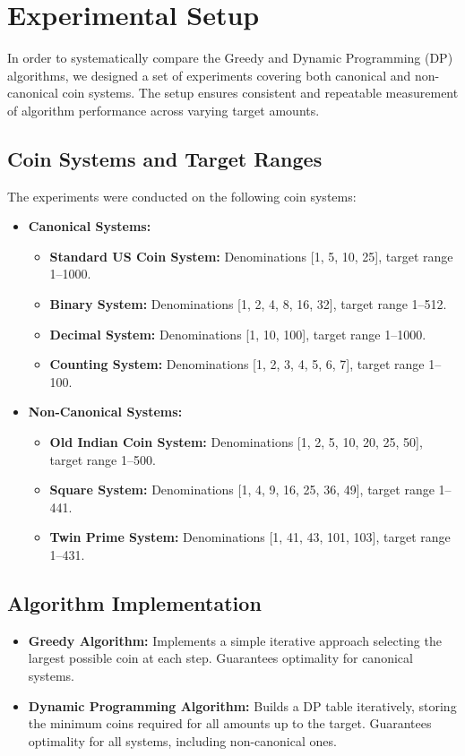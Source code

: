 \documentclass[12pt,a4paper]{report}
\begin{document}
\section{Experimental Setup}
\label{sec:comparison_experimental_setup}

In order to systematically compare the Greedy and Dynamic Programming (DP) algorithms, we designed a set of experiments covering both canonical and non-canonical coin systems. The setup ensures consistent and repeatable measurement of algorithm performance across varying target amounts.

\subsection{Coin Systems and Target Ranges}
The experiments were conducted on the following coin systems:

\begin{itemize}
    \item \textbf{Canonical Systems:}
    \begin{itemize}
        \item \textbf{Standard US Coin System:} Denominations [1, 5, 10, 25], target range 1--1000.
        \item \textbf{Binary System:} Denominations [1, 2, 4, 8, 16, 32], target range 1--512.
        \item \textbf{Decimal System:} Denominations [1, 10, 100], target range 1--1000.
        \item \textbf{Counting System:} Denominations [1, 2, 3, 4, 5, 6, 7], target range 1--100.
    \end{itemize}
    
    \item \textbf{Non-Canonical Systems:}
    \begin{itemize}
        \item \textbf{Old Indian Coin System:} Denominations [1, 2, 5, 10, 20, 25, 50], target range 1--500.
        \item \textbf{Square System:} Denominations [1, 4, 9, 16, 25, 36, 49], target range 1--441.
        \item \textbf{Twin Prime System:} Denominations [1, 41, 43, 101, 103], target range 1--431.
    \end{itemize}
\end{itemize}

\subsection{Algorithm Implementation}
\begin{itemize}
    \item \textbf{Greedy Algorithm:} Implements a simple iterative approach selecting the largest possible coin at each step. Guarantees optimality for canonical systems.
    \item \textbf{Dynamic Programming Algorithm:} Builds a DP table iteratively, storing the minimum coins required for all amounts up to the target. Guarantees optimality for all systems, including non-canonical ones.
\end{itemize}
\end{document}
